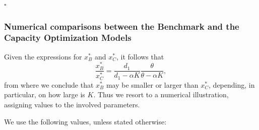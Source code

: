 \begin{flushright}
 $\square$
\end{flushright}


\subsubsection{Numerical comparisons between the Benchmark and the Capacity Optimization Models}



Given the expressions for $x^*_B$ and $x^*_C$, it follows that
$$ \frac{x^*_B}{x^*_C}=\frac{d_1}{d_1-\alpha K} \frac{\theta}{\theta-\alpha K},$$
from where we conclude that $x^*_B$ may be smaller or larger than $x^*_C$, depending, in particular, on how large is $K$. Thus we resort to a numerical illustration, assigning values to the involved parameters.

We use the following values, unless stated otherwise:

